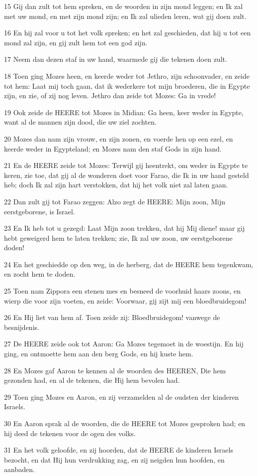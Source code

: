 \par 15 Gij dan zult tot hem spreken, en de woorden in zijn mond leggen; en Ik zal met uw mond, en met zijn mond zijn; en Ik zal ulieden leren, wat gij doen zult.
\par 16 En hij zal voor u tot het volk spreken; en het zal geschieden, dat hij u tot een mond zal zijn, en gij zult hem tot een god zijn.
\par 17 Neem dan dezen staf in uw hand, waarmede gij die tekenen doen zult.
\par 18 Toen ging Mozes heen, en keerde weder tot Jethro, zijn schoonvader, en zeide tot hem: Laat mij toch gaan, dat ik wederkere tot mijn broederen, die in Egypte zijn, en zie, of zij nog leven. Jethro dan zeide tot Mozes: Ga in vrede!
\par 19 Ook zeide de HEERE tot Mozes in Midian: Ga heen, keer weder in Egypte, want al de mannen zijn dood, die uw ziel zochten.
\par 20 Mozes dan nam zijn vrouw, en zijn zonen, en voerde hen op een ezel, en keerde weder in Egypteland; en Mozes nam den staf Gods in zijn hand.
\par 21 En de HEERE zeide tot Mozes: Terwijl gij heentrekt, om weder in Egypte te keren, zie toe, dat gij al de wonderen doet voor Farao, die Ik in uw hand gesteld heb; doch Ik zal zijn hart verstokken, dat hij het volk niet zal laten gaan.
\par 22 Dan zult gij tot Farao zeggen: Alzo zegt de HEERE: Mijn zoon, Mijn eerstgeborene, is Israel.
\par 23 En Ik heb tot u gezegd: Laat Mijn zoon trekken, dat hij Mij diene! maar gij hebt geweigerd hem te laten trekken; zie, Ik zal uw zoon, uw eerstgeborene doden!
\par 24 En het geschiedde op den weg, in de herberg, dat de HEERE hem tegenkwam, en zocht hem te doden.
\par 25 Toen nam Zippora een stenen mes en besneed de voorhuid haars zoons, en wierp die voor zijn voeten, en zeide: Voorwaar, gij zijt mij een bloedbruidegom!
\par 26 En Hij liet van hem af. Toen zeide zij: Bloedbruidegom! vanwege de besnijdenis.
\par 27 De HEERE zeide ook tot Aaron: Ga Mozes tegemoet in de woestijn. En hij ging, en ontmoette hem aan den berg Gods, en hij kuste hem.
\par 28 En Mozes gaf Aaron te kennen al de woorden des HEEREN, Die hem gezonden had, en al de tekenen, die Hij hem bevolen had.
\par 29 Toen ging Mozes en Aaron, en zij verzamelden al de oudsten der kinderen Israels.
\par 30 En Aaron sprak al de woorden, die de HEERE tot Mozes gesproken had; en hij deed de tekenen voor de ogen des volks.
\par 31 En het volk geloofde, en zij hoorden, dat de HEERE de kinderen Israels bezocht, en dat Hij hun verdrukking zag, en zij neigden hun hoofden, en aanbaden.

